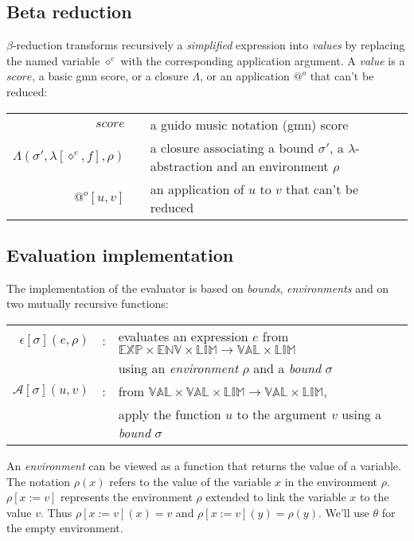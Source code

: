 \documentclass[10pt,a4paper,frenchb]{article}
\makeatletter
\newcommand{\var}[1]{\diamond^#1}
\newcommand{\expr}{\mathbb{EXP}}
\newcommand{\val}{\mathbb{VAL}}
\newcommand{\env}{\mathbb{ENV}}
\newcommand{\closure}{\Lambda}
\newcommand{\noredex}{@^o}
\newcommand{\bounddomain}{\mathbb{LIM}}
\newcommand{\edomain}[3]{$#1 \times #2 \times \bounddomain \rightarrow #3 \times \bounddomain$}
\newcommand{\evalsym}{\epsilon}
\newcommand{\eval}[2][\bounds]{\evalsym[#1](#2,\rho)}
\newcommand{\envsym}{\rho}
\newcommand{\emptyenv}{\theta}
\newcommand{\closenv}[3][\var{e}]{\closure(#3,\lambda[#1,#2],\envsym)}
\newcommand{\apply}[1][\bounds]	{{\mathcal A}[#1]}
\newcommand{\bounds}		{\sigma}
\makeatother
\begin{document}
\subsection{Beta reduction}

$\beta$-reduction transforms recursively a \emph{simplified} expression into \emph{values} by replacing the named variable $\var{e}$ with the corresponding application argument. A \emph{value} is a $score$, a basic gmn score, or a closure $\closure$, or an application $\noredex$ that can't be reduced:
\begin{center}
\begin{tabular}{rc@{ : }l}
 $score$				& & a guido music notation (gmn) score \\
 $\closenv{f}{\bounds{'}}$ 		& & a closure associating a bound $\bounds'$,  a $\lambda$-abstraction and an environment $\envsym$ \\
 $\noredex[u,v]$ 		& & an application of $u$ to $v$ that can't be reduced \\
\end{tabular}
\end{center}


\subsection{Evaluation implementation}

The implementation of the evaluator is based on \emph{bounds}, \emph{environments} and on two mutually recursive functions:
\begin{center}
\begin{tabular}{rcl}
$\eval{e}$ & : & evaluates an expression $e$ from \edomain{\expr}{\env}{\val} \\
		  & & using an \emph{environment} $\envsym$ and a \emph{bound} $\bounds$ \\
$\apply(u,v)$  & : & from \edomain{\val}{\val}{\val}, \\
			& & apply the function $u$ to the argument $v$ using a \emph{bound} $\bounds$ \\
\end{tabular}
\end{center}


An \emph{environment} can be viewed as a function that returns the value of a variable. The notation $\envsym(x)$ refers to the value of the variable $x$ in the environment $\envsym$. $\envsym[x := v]$ represents the environment $\envsym$ extended to link the variable $x$ to the value $v$. Thus $\envsym[x := v](x) = v$ and $\envsym[x := v](y) = \envsym(y)$. We'll use $\emptyenv $ for the empty environment.
\end{document}
